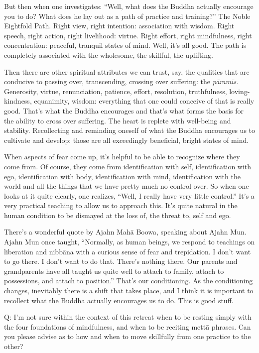 But then when one investigates: “Well, what does the Buddha actually
encourage you to do? What does he lay out as a path of practice and
training?” The Noble Eightfold Path. Right view, right intention:
association with wisdom. Right speech, right action, right livelihood:
virtue. Right effort, right mindfulness, right concentration: peaceful,
tranquil states of mind. Well, it’s all good. The path is completely
associated with the wholesome, the skillful, the uplifting.

Then there are other spiritual attributes we can trust, say, the
qualities that are conducive to passing over, transcending, crossing
over suffering: the \emph{pāramīs}. Generosity, virtue, renunciation,
patience, effort, resolution, truthfulness, loving-kindness, equanimity,
wisdom: everything that one could conceive of that is really good.
That’s what the Buddha encourages and that’s what forms the basis for
the ability to cross over suffering. The heart is replete with
well-being and stability. Recollecting and reminding oneself of what the
Buddha encourages us to cultivate and develop: those are all exceedingly
beneficial, bright states of mind.

When aspects of fear come up, it’s helpful to be able to recognize where
they come from. Of course, they come from identification with self,
identification with ego, identification with body, identification with
mind, identification with the world and all the things that we have
pretty much no control over. So when one looks at it quite clearly, one
realizes, “Well, I really have very little control.” It’s a very
practical teaching to allow us to approach this. It’s quite natural in
the human condition to be dismayed at the loss of, the threat to, self
and ego.

There’s a wonderful quote by Ajahn Mahā Boowa, speaking about Ajahn Mun.
Ajahn Mun once taught, “Normally, as human beings, we respond to
teachings on liberation and nibbāna with a curious sense of fear and
trepidation. I don’t want to go there. I don’t want to do that. There’s
nothing there. Our parents and grandparents have all taught us quite
well to attach to family, attach to possessions, and attach to
position.” That’s our conditioning. As the conditioning changes,
inevitably there is a shift that takes place, and I think it is
important to recollect what the Buddha actually encourages us to do.
This is good stuff.

\qaspace
Q: I’m not sure within the context of this retreat when to be resting
simply with the four foundations of mindfulness, and when to be reciting
mettā phrases. Can you please advise as to how and when to move
skillfully from one practice to the other?


